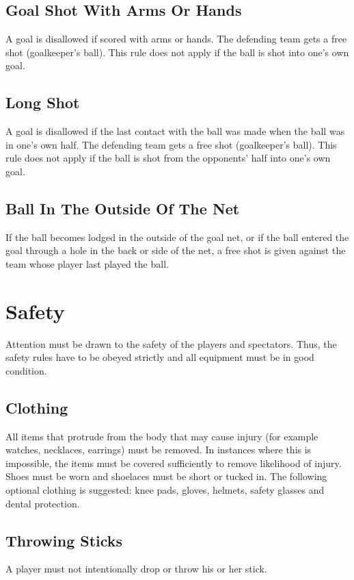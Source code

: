 \subsection{Goal Shot With Arms Or Hands \label{subsec:hockey_goal-shots_with-arms-or-hands}}
A goal is disallowed if scored with arms or hands.
The defending team gets a free shot (goalkeeper's ball).
This rule does not apply if the ball is shot into one's own goal.

\subsection{Long Shot}
A goal is disallowed if the last contact with the ball was made when the ball was in one's own half.
The defending team gets a free shot (goalkeeper's ball).
This rule does not apply if the ball is shot from the opponents' half into one's
own goal.

\subsection{Ball In The Outside Of The Net}
If the ball becomes lodged in the outside of the goal net, or if the ball entered the goal through a hole in the back or side of the net, a free shot is given against the team whose player last played the ball.

\section{Safety}

Attention must be drawn to the safety of the players and spectators.
Thus, the safety rules have to be obeyed strictly and all equipment must be in good condition.

\subsection{Clothing \label{subsec:hockey_safety_clothing}}
All items that protrude from the body that may cause injury (for example watches, necklaces, earrings) must be removed.
In instances where this is impossible, the items must be covered sufficiently to remove likelihood of injury.
Shoes must be worn and shoelaces must be short or tucked in.
The following optional clothing is suggested: knee pads, gloves, helmets, safety glasses and dental protection.

\subsection{Throwing Sticks}
A player must not intentionally drop or throw his or her stick.

